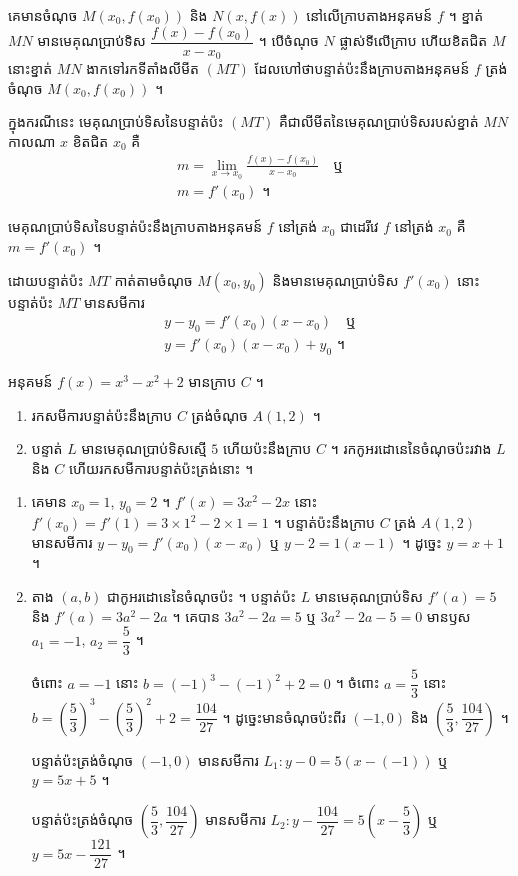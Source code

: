 គេមានចំណុច $M(x_0, f(x_0))$ និង $N(x, f(x))$ នៅលើក្រាបតាងអនុគមន៍ $f$ ។ ខ្នាត់ $MN$ មានមេគុណប្រាប់ទិស $\dfrac{f(x) - f(x_0)}{x - x_0}$ ។ បើចំណុច $N$ ផ្លាស់ទីលើក្រាប ហើយខិតជិត $M$ នោះខ្នាត់ $MN$ ងាកទៅរកទីតាំងលីមីត $(MT)$ ដែលហៅថាបន្ទាត់ប៉ះនឹងក្រាបតាងអនុគមន៍ $f$ ត្រង់ចំណុច $M(x_0, f(x_0))$ ។

ក្នុងករណីនេះ មេគុណប្រាប់ទិសនៃបន្ទាត់ប៉ះ $(MT)$ គឺជាលីមីតនៃមេគុណប្រាប់ទិសរបស់ខ្នាត់ $MN$ កាលណា $x$ ខិតជិត $x_0$ គឺ
\[
\begin{gathered}
m = \lim_{x \to x_0}\frac{f(x) - f(x_0)}{x - x_0} \quad \text{ឬ}\\
m = f'(x_0) \text{ ។}
\end{gathered}
\]

\begin{formulaBox}[ជាទូទៅ]
មេគុណប្រាប់ទិសនៃបន្ទាត់ប៉ះនឹងក្រាបតាងអនុគមន៍ $f$ នៅត្រង់ $x_0$ ជាដេរីវេ $f$ នៅត្រង់ $x_0$ គឺ $m = f'(x_0)$ ។
\end{formulaBox}

ដោយបន្ទាត់ប៉ះ $MT$ កាត់តាមចំណុច $M(x_0, y_0)$ និងមានមេគុណប្រាប់ទិស $f'(x_0)$ នោះបន្ទាត់ប៉ះ $MT$ មានសមីការ
\[
\begin{gathered}
y - y_0 = f'(x_0)(x - x_0) \quad \text{ឬ}\\
y = f'(x_0)(x - x_0) + y_0 \text{ ។}
\end{gathered}
\]

\begin{example}[លំហាត់គំរូ]
អនុគមន៍ $f(x) = x^3 - x^2 + 2$ មានក្រាប $C$ ។
\begin{enumerate}[a]
  \item រកសមីការបន្ទាត់ប៉ះនឹងក្រាប $C$ ត្រង់ចំណុច $A(1, 2)$ ។
  \item បន្ទាត់ $L$ មានមេគុណប្រាប់ទិសស្មើ $5$ ហើយប៉ះនឹងក្រាប $C$ ។ រកកូអរដោនេនៃចំណុចប៉ះរវាង $L$ និង $C$ ហើយរកសមីការបន្ទាត់ប៉ះត្រង់នោះ ។
\end{enumerate}
\end{example}
\ans
\begin{enumerate}[a]
  \item គេមាន $x_0 = 1$, $y_0 = 2$ ។ $f'(x) = 3x^2 - 2x$ នោះ $f'(x_0) = f'(1) = 3\times 1^2 - 2\times 1 = 1$ ។ បន្ទាត់ប៉ះនឹងក្រាប $C$ ត្រង់ $A(1, 2)$ មានសមីការ $y - y_0 = f'(x_0)(x - x_0)$ ឬ $y - 2 = 1(x - 1)$ ។ ដូច្នេះ $y = x + 1$ ។
  \item តាង $(a, b)$ ជាកូអរដោនេនៃចំណុចប៉ះ ។ បន្ទាត់ប៉ះ $L$ មានមេគុណប្រាប់ទិស $f'(a) = 5$ និង $f'(a) = 3a^2 - 2a$ ។ គេបាន $3a^2 - 2a = 5$ ឬ $3a^2 - 2a - 5 = 0$ មានឫស $a_1 = -1$, $a_2 = \dfrac{5}{3}$ ។

  ចំពោះ $a = -1$ នោះ $b = (-1)^3 - (-1)^2 + 2 = 0$ ។ ចំពោះ $a = \dfrac{5}{3}$ នោះ $b = \left(\dfrac{5}{3}\right)^3 - \left(\dfrac{5}{3}\right)^2 + 2 = \dfrac{104}{27}$ ។ ដូច្នេះមានចំណុចប៉ះពីរ $(-1, 0)$ និង $\left(\dfrac{5}{3}, \dfrac{104}{27}\right)$ ។

  បន្ទាត់ប៉ះត្រង់ចំណុច $(-1, 0)$ មានសមីការ $L_1 : y - 0 = 5(x - (-1))$ ឬ $y = 5x + 5$ ។

  បន្ទាត់ប៉ះត្រង់ចំណុច $\left(\dfrac{5}{3}, \dfrac{104}{27}\right)$ មានសមីការ $L_2 : y - \dfrac{104}{27} = 5\left(x - \dfrac{5}{3}\right)$ ឬ $y = 5x - \dfrac{121}{27}$ ។
\end{enumerate}

